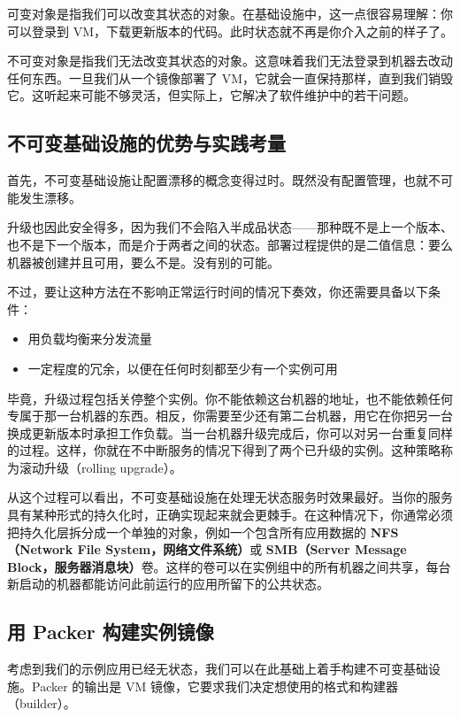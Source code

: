 \label{idx:970}
可变对象是指我们可以改变其状态的对象。在基础设施中，这一点很容易理解：你可以登录到 VM，下载更新版本的代码。此时状态就不再是你介入之前的样子了。

不可变对象是指我们无法改变其状态的对象。这意味着我们无法登录到机器去改动任何东西。一旦我们从一个镜像部署了 VM，它就会一直保持那样，直到我们销毁它。这听起来可能不够灵活，但实际上，它解决了软件维护中的若干问题。

\subsection{不可变基础设施的优势与实践考量}

\label{idx:971}
首先，不可变基础设施让配置漂移的概念变得过时。既然没有配置管理，也就不可能发生漂移。

\label{idx:972}
升级也因此安全得多，因为我们不会陷入半成品状态——那种既不是上一个版本、也不是下一个版本，而是介于两者之间的状态。部署过程提供的是二值信息：要么机器被创建并且可用，要么不是。没有别的可能。

不过，要让这种方法在不影响正常运行时间的情况下奏效，你还需要具备以下条件：

\begin{itemize}
\item 用负载均衡来分发流量
\item 一定程度的冗余，以便在任何时刻都至少有一个实例可用
\end{itemize}

毕竟，升级过程包括关停整个实例。你不能依赖这台机器的地址，也不能依赖任何专属于那一台机器的东西。相反，你需要至少还有第二台机器，用它在你把另一台换成更新版本时承担工作负载。当一台机器升级完成后，你可以对另一台重复同样的过程。这样，你就在不中断服务的情况下得到了两个已升级的实例。这种策略称为滚动升级（rolling upgrade）。

\label{idx:973}
\label{idx:974}
从这个过程可以看出，不可变基础设施在处理无状态服务时效果最好。当你的服务具有某种形式的持久化时，正确实现起来就会更棘手。在这种情况下，你通常必须把持久化层拆分成一个单独的对象，例如一个包含所有应用数据的 \textbf{NFS（Network File System，网络文件系统）}或 \textbf{SMB（Server Message Block，服务器消息块）}卷。这样的卷可以在实例组中的所有机器之间共享，每台新启动的机器都能访问此前运行的应用所留下的公共状态。

\subsection{用 Packer 构建实例镜像}

\label{idx:975}
\label{idx:976}
\label{idx:977}
考虑到我们的示例应用已经无状态，我们可以在此基础上着手构建不可变基础设施。Packer 的输出是 VM 镜像，它要求我们决定想使用的格式和构建器（builder）。

